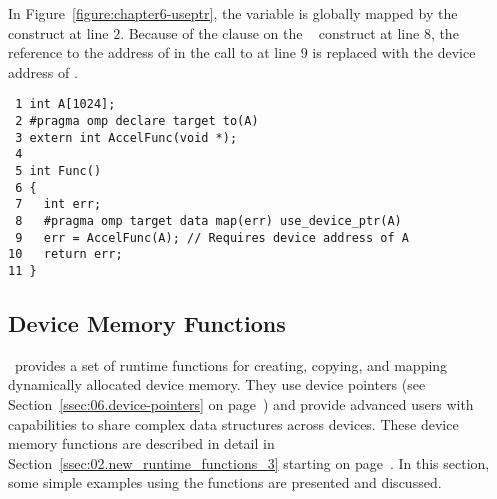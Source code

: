 In Figure~\ref{figure:chapter6-useptr}, the variable  is globally mapped by
the ~ construct at line $2$.  Because of the
 clause on the ~ construct at line
$8$, the reference to the address of  in the call to  at line
$9$ is replaced with the device address of .

\begin{figure*}[!tb]
\begin{verbatim}
 1 int A[1024];
 2 #pragma omp declare target to(A)
 3 extern int AccelFunc(void *);
 4 
 5 int Func()
 6 {
 7   int err;
 8   #pragma omp target data map(err) use_device_ptr(A)
 9   err = AccelFunc(A); // Requires device address of A
10   return err;
11 }
\end{verbatim}
\caption{ \textbf {Example of the use\_device\_ptr clause} -- \small
          Replace the reference to the host address of \texttt{A} in the lexical
          scope of the \texttt{target data} construct with
          the device address of \texttt{A}.
        }
\label{figure:chapter6-useptr}
\end{figure*}

\subsection{Device Memory Functions}
\label{sec:06.device-memory-routines}

\OMP\ provides a set of runtime functions for creating, copying, and mapping
dynamically allocated device memory.  They use device pointers (see
Section~\ref{ssec:06.device-pointers} on page~\pageref{ssec:06.device-pointers}) and provide advanced users with
capabilities to share complex data structures across devices.  
These device memory functions are described in detail in
Section~\ref{ssec:02.new_runtime_functions_3} starting on
page~\pageref{ssec:02.new_runtime_functions_3}.  
In this section, some simple examples using the functions are presented and discussed.


